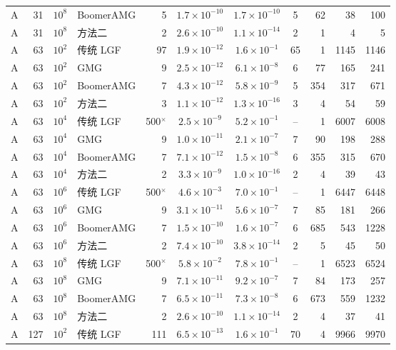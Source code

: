 \begin{longtable}{lrrlrcccrrr}
A & 31 & $10^{8}$ & BoomerAMG & 5 & $1.7{\times}10^{-10}$ & $1.7{\times}10^{-10}$ & 5 & 62 & 38 & 100 \\
A & 31 & $10^{8}$ & 方法二 & 2 & $2.6{\times}10^{-10}$ & $1.1{\times}10^{-14}$ & 2 & 1 & 4 & 5 \\
A & 63 & $10^{2}$ & 传统 LGF & 97 & $1.9{\times}10^{-12}$ & $1.6{\times}10^{-1}$ & 65 & 1 & 1145 & 1146 \\
A & 63 & $10^{2}$ & GMG & 9 & $2.5{\times}10^{-12}$ & $6.1{\times}10^{-8}$ & 6 & 77 & 165 & 241 \\
A & 63 & $10^{2}$ & BoomerAMG & 7 & $4.3{\times}10^{-12}$ & $5.8{\times}10^{-9}$ & 5 & 354 & 317 & 671 \\
A & 63 & $10^{2}$ & 方法二 & 3 & $1.1{\times}10^{-12}$ & $1.3{\times}10^{-16}$ & 3 & 4 & 54 & 59 \\
A & 63 & $10^{4}$ & 传统 LGF & 500$^\times$ & $2.5{\times}10^{-9}$ & $5.2{\times}10^{-1}$ & -- & 1 & 6007 & 6008 \\
A & 63 & $10^{4}$ & GMG & 9 & $1.0{\times}10^{-11}$ & $2.1{\times}10^{-7}$ & 7 & 90 & 198 & 288 \\
A & 63 & $10^{4}$ & BoomerAMG & 7 & $7.1{\times}10^{-12}$ & $1.5{\times}10^{-8}$ & 6 & 355 & 315 & 670 \\
A & 63 & $10^{4}$ & 方法二 & 2 & $3.3{\times}10^{-9}$ & $1.0{\times}10^{-16}$ & 2 & 4 & 39 & 43 \\
A & 63 & $10^{6}$ & 传统 LGF & 500$^\times$ & $4.6{\times}10^{-3}$ & $7.0{\times}10^{-1}$ & -- & 1 & 6447 & 6448 \\
A & 63 & $10^{6}$ & GMG & 9 & $3.1{\times}10^{-11}$ & $5.6{\times}10^{-7}$ & 7 & 85 & 181 & 266 \\
A & 63 & $10^{6}$ & BoomerAMG & 7 & $1.5{\times}10^{-10}$ & $1.6{\times}10^{-7}$ & 6 & 685 & 543 & 1228 \\
A & 63 & $10^{6}$ & 方法二 & 2 & $7.4{\times}10^{-10}$ & $3.8{\times}10^{-14}$ & 2 & 5 & 45 & 50 \\
A & 63 & $10^{8}$ & 传统 LGF & 500$^\times$ & $5.8{\times}10^{-2}$ & $7.8{\times}10^{-1}$ & -- & 1 & 6523 & 6524 \\
A & 63 & $10^{8}$ & GMG & 9 & $7.1{\times}10^{-11}$ & $9.2{\times}10^{-7}$ & 7 & 84 & 173 & 257 \\
A & 63 & $10^{8}$ & BoomerAMG & 7 & $6.5{\times}10^{-11}$ & $7.3{\times}10^{-8}$ & 6 & 673 & 559 & 1232 \\
A & 63 & $10^{8}$ & 方法二 & 2 & $2.6{\times}10^{-10}$ & $1.1{\times}10^{-14}$ & 2 & 4 & 37 & 41 \\
A & 127 & $10^{2}$ & 传统 LGF & 111 & $6.5{\times}10^{-13}$ & $1.6{\times}10^{-1}$ & 70 & 4 & 9966 & 9970 \\

\end{longtable}
